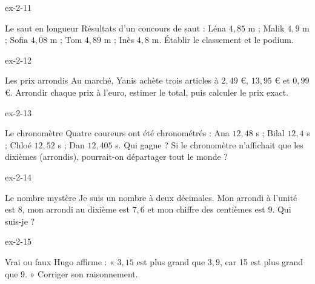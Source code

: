 \begin{blocLivre}{ex-2-11}\begin{exercice}[3]{Le saut en longueur}
Résultats d’un concours de saut : Léna $4{,}85$ m ; Malik $4{,}9$ m ; Sofia $4{,}08$ m ; Tom $4{,}89$ m ; Inès $4{,}8$ m. Établir le classement et le podium.
\end{exercice}\end{blocLivre}
\begin{blocLivre}{ex-2-12}\begin{exercice}[3]{Les prix arrondis}
Au marché, Yanis achète trois articles à $2{,}49$ €, $13{,}95$ € et $0{,}99$ €. Arrondir chaque prix à l’euro, estimer le total, puis calculer le prix exact.
\end{exercice}\end{blocLivre}
\begin{blocLivre}{ex-2-13}\begin{exercice}[3]{Le chronomètre}
Quatre coureurs ont été chronométrés : Ana $12{,}48$ s ; Bilal $12{,}4$ s ; Chloé $12{,}52$ s ; Dan $12{,}405$ s. Qui gagne ? Si le chronomètre n’affichait que les dixièmes (arrondis), pourrait-on départager tout le monde ?
\end{exercice}\end{blocLivre}
\begin{blocLivre}{ex-2-14}\begin{exercice}[3]{Le nombre mystère}
Je suis un nombre à deux décimales. Mon arrondi à l’unité est 8, mon arrondi au dixième est $7{,}6$ et mon chiffre des centièmes est 9. Qui suis-je ?
\end{exercice}\end{blocLivre}
\begin{blocLivre}{ex-2-15}\begin{exercice}[3]{Vrai ou faux}
Hugo affirme : « $3{,}15$ est plus grand que $3{,}9$, car 15 est plus grand que 9. » Corriger son raisonnement.
\end{exercice}\end{blocLivre}

\clearpage
